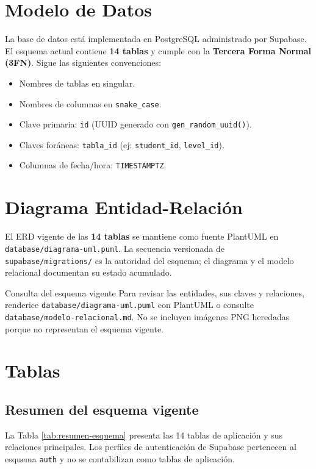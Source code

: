 \section{Modelo de Datos}

La base de datos está implementada en PostgreSQL administrado por Supabase. El esquema actual contiene \textbf{14 tablas} y cumple con la \textbf{Tercera Forma Normal (3FN)}. Sigue las siguientes convenciones:

\begin{itemize}
    \item Nombres de tablas en singular.
    \item Nombres de columnas en \texttt{snake\_case}.
    \item Clave primaria: \texttt{id} (UUID generado con \texttt{gen\_random\_uuid()}).
    \item Claves foráneas: \texttt{tabla\_id} (ej: \texttt{student\_id}, \texttt{level\_id}).
    \item Columnas de fecha/hora: \texttt{TIMESTAMPTZ}.
\end{itemize}

\section{Diagrama Entidad-Relación}

El ERD vigente de las \textbf{14 tablas} se mantiene como fuente PlantUML en \texttt{database/diagrama-uml.puml}. La secuencia versionada de \texttt{supabase/migrations/} es la autoridad del esquema; el diagrama y el modelo relacional documentan su estado acumulado.

\begin{IHBoxInfo}{Consulta del esquema vigente}
Para revisar las entidades, sus claves y relaciones, renderice \texttt{database/diagrama-uml.puml} con PlantUML o consulte \texttt{database/modelo-relacional.md}. No se incluyen imágenes PNG heredadas porque no representan el esquema vigente.
\end{IHBoxInfo}

\section{Tablas}

\subsection{Resumen del esquema vigente}

La Tabla \ref{tab:resumen-esquema} presenta las 14 tablas de aplicación y sus relaciones principales. Los perfiles de autenticación de Supabase pertenecen al esquema \texttt{auth} y no se contabilizan como tablas de aplicación.


